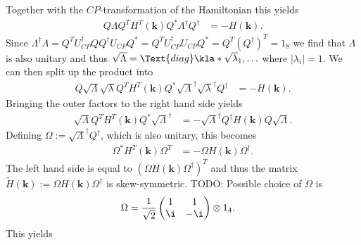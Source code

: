 \documentclass[english, parskip=full]{scrartcl}
\begin{document}
Together with the $CP$-transformation of the Hamiltonian this yields
\begin{align}
Q\Lambda Q^T H^T(\textbf{k}) Q^\ast \Lambda^\dagger Q^\dagger &= -H(\textbf{k}).
\end{align}
Since $\Lambda^\dagger\Lambda = Q^T U_{CP}^\dagger Q Q^\dagger U_{CP} Q^\ast = Q^T U_{CP}^\dagger U_{CP} Q^\ast = Q^T(Q^\dagger)^T = 1_8$ we find that $\Lambda$ is also unitary and thus $\sqrt{\Lambda} = \Text{diag}\kla*{\sqrt{\lambda}_1, \dots}$ where $|\lambda_i|=1$.
We can then split up the product into
\begin{align}
Q\sqrt{\Lambda} \sqrt{\lambda}Q^T H^T(\textbf{k}) Q^\ast \sqrt{\Lambda}^\dagger \sqrt{\lambda}^\dagger Q^\dagger &= -H(\textbf{k}).
\end{align}
Bringing the outer factors to the right hand side yields
\begin{align}
\sqrt{\Lambda}Q^T H^T(\textbf{k}) Q^\ast \sqrt{\Lambda}^\dagger &= -\sqrt{\Lambda}^\dagger Q^\dagger H(\textbf{k})Q\sqrt{\Lambda}.
\end{align}
Defining $\Omega := \sqrt{\Lambda}^\dagger Q^\dagger$, which is also unitary, this becomes
\begin{align}
\Omega^\ast H^T(\textbf{k}) \Omega^T &= -\Omega H(\textbf{k}) \Omega^\dagger.
\end{align}
The left hand side is equal to $(\Omega H(\textbf{k}) \Omega^\dagger)^T$ and thus the matrix $\tilde{H}(\textbf{k}) := \Omega H(\textbf{k}) \Omega^\dagger$ is skew-symmetric.
TODO: Possible choice of $\Omega$ is
\begin{align}
\Omega &= \frac{1}{\sqrt{2}} \begin{pmatrix}
1 & 1 \\ \i & -\i
\end{pmatrix} \otimes 1_4.
\end{align}
This yields
\end{document}
